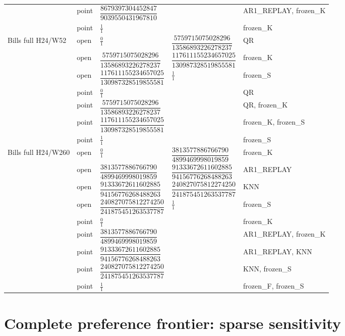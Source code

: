 \documentclass[11pt,a4paper]{article}
\begin{document}
\begin{longtable}{p{28mm}p{10mm}p{39mm}p{39mm}p{28mm}}
 & point & \(\dfrac{8679397304452847}{9039550431967810}\) &  & AR1\_REPLAY, frozen\_K \\
 & point & \(\frac{1}{1}\) &  & frozen\_K \\
Bills full H24/W52 & open & \(\frac{0}{1}\) & \(\dfrac{5759715075028296}{13586893226278237}\) & QR \\
 & open & \(\dfrac{5759715075028296}{13586893226278237}\) & \(\dfrac{117611155234657025}{130987328519855581}\) & frozen\_K \\
 & open & \(\dfrac{117611155234657025}{130987328519855581}\) & \(\frac{1}{1}\) & frozen\_S \\
 & point & \(\frac{0}{1}\) &  & QR \\
 & point & \(\dfrac{5759715075028296}{13586893226278237}\) &  & QR, frozen\_K \\
 & point & \(\dfrac{117611155234657025}{130987328519855581}\) &  & frozen\_K, frozen\_S \\
 & point & \(\frac{1}{1}\) &  & frozen\_S \\
Bills full H24/W260 & open & \(\frac{0}{1}\) & \(\dfrac{3813577886766790}{4899469998019859}\) & frozen\_K \\
 & open & \(\dfrac{3813577886766790}{4899469998019859}\) & \(\dfrac{91333672611602885}{94156776268488263}\) & AR1\_REPLAY \\
 & open & \(\dfrac{91333672611602885}{94156776268488263}\) & \(\dfrac{240827075812274250}{241875451263537787}\) & KNN \\
 & open & \(\dfrac{240827075812274250}{241875451263537787}\) & \(\frac{1}{1}\) & frozen\_S \\
 & point & \(\frac{0}{1}\) &  & frozen\_K \\
 & point & \(\dfrac{3813577886766790}{4899469998019859}\) &  & AR1\_REPLAY, frozen\_K \\
 & point & \(\dfrac{91333672611602885}{94156776268488263}\) &  & AR1\_REPLAY, KNN \\
 & point & \(\dfrac{240827075812274250}{241875451263537787}\) &  & KNN, frozen\_S \\
 & point & \(\frac{1}{1}\) &  & frozen\_F, frozen\_S \\
\end{longtable}
\endgroup

\section{Complete preference frontier: sparse sensitivity}\label{sup:frontier-8}
\end{document}
